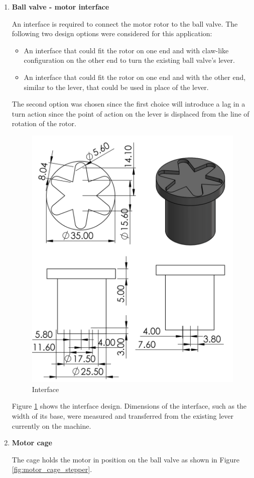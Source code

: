\begin{enumerate}
\begin{enumerate}
    \item \textbf{Ball valve - motor interface}
    \par
    An interface is required to connect the motor rotor to the ball valve. The following  two design options were considered for this application:
    \begin{itemize}
        \item An interface that could fit the rotor on one end and with claw-like configuration on the other end to turn the existing ball valve's lever.
        \item An interface that could fit the rotor on one end and with the other end, similar to the lever, that could be used in place of the lever.
    \end{itemize}
    \par
    The second option was chosen since the first choice will introduce a lag in a turn action since the point of action on the lever is displaced from the line of rotation of the rotor.
    \begin{figure}[H]
        \centering
        \includegraphics[height=0.5\textheight]{Figures/interface.PNG}
        \caption{Interface}
        \label{fig:Interface}
    \end{figure}
    Figure \ref{fig:Interface} shows the interface design. Dimensions of the interface, such as the width of its base, were measured and transferred from the existing lever currently on the machine.
    \par
    \item \textbf{Motor cage}
    \par
    The cage holds the motor in position on the ball valve as 
   shown in Figure \ref{fig:motor_cage_stepper}.
    

\end{enumerate}
\end{enumerate}
